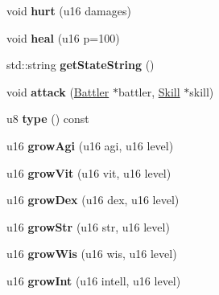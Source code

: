 \begin{DoxyCompactItemize}
\item 
\hypertarget{classBattler_ac6c38c2b25cd94cb6347a1c01f43611c}{void {\bfseries hurt} (u16 damages)}\label{classBattler_ac6c38c2b25cd94cb6347a1c01f43611c}

\item 
\hypertarget{classBattler_ab7a13261d2d559cbbaa0f11d9be80204}{void {\bfseries heal} (u16 p=100)}\label{classBattler_ab7a13261d2d559cbbaa0f11d9be80204}

\item 
\hypertarget{classBattler_a1d6085f40737ed797872a94e338f3601}{std\-::string {\bfseries get\-State\-String} ()}\label{classBattler_a1d6085f40737ed797872a94e338f3601}

\item 
\hypertarget{classBattler_af9922877cc1167a5b79b5245e75adbe7}{void {\bfseries attack} (\hyperlink{classBattler}{Battler} $\ast$battler, \hyperlink{classSkill}{Skill} $\ast$skill)}\label{classBattler_af9922877cc1167a5b79b5245e75adbe7}

\item 
\hypertarget{classBattler_ad653d2ff376d5941db6bc75ba805f5bc}{u8 {\bfseries type} () const }\label{classBattler_ad653d2ff376d5941db6bc75ba805f5bc}

\item 
\hypertarget{classBattler_a3a94f8d955ff7ce42048dc5c12f21905}{u16 {\bfseries grow\-Agi} (u16 agi, u16 level)}\label{classBattler_a3a94f8d955ff7ce42048dc5c12f21905}

\item 
\hypertarget{classBattler_a3aa5681e1b435c136d63854fdeaf256f}{u16 {\bfseries grow\-Vit} (u16 vit, u16 level)}\label{classBattler_a3aa5681e1b435c136d63854fdeaf256f}

\item 
\hypertarget{classBattler_a16c21cc699caa7344c181782a162a97e}{u16 {\bfseries grow\-Dex} (u16 dex, u16 level)}\label{classBattler_a16c21cc699caa7344c181782a162a97e}

\item 
\hypertarget{classBattler_a432a84b99564806a048d704d33751f3a}{u16 {\bfseries grow\-Str} (u16 str, u16 level)}\label{classBattler_a432a84b99564806a048d704d33751f3a}

\item 
\hypertarget{classBattler_a7743cd218d202b911026a7a628793fda}{u16 {\bfseries grow\-Wis} (u16 wis, u16 level)}\label{classBattler_a7743cd218d202b911026a7a628793fda}

\item 
\hypertarget{classBattler_a434a9dbfa8b81860c02aefd180aac7d6}{u16 {\bfseries grow\-Int} (u16 intell, u16 level)}\label{classBattler_a434a9dbfa8b81860c02aefd180aac7d6}


\end{DoxyCompactItemize}
